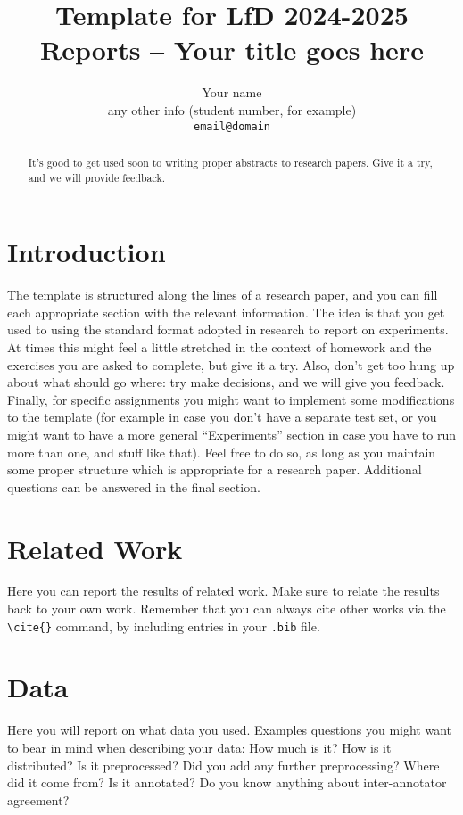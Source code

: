 \documentclass[11pt]{article}
\title{Template for LfD 2024-2025 Reports -- Your title goes here}
\author{Your name \\
  any other info (student number, for example) \\
  {\tt email@domain}}
\date{}
\begin{document}
\maketitle
\begin{abstract}
It's good to get used soon to writing proper abstracts to research papers. Give it a try, and we will provide feedback.
 \end{abstract}



\section{Introduction}

The template is structured along the lines of a research paper, and you can fill each appropriate section with the relevant information. The idea is that you get used to using the standard format adopted in research to report on experiments. At times this might feel a little stretched in the context of homework and the exercises you are asked to complete, but give it a try. Also, don't get too hung up about what should go where: try make decisions, and we will give you feedback. Finally, for specific assignments you might want to implement some modifications to the template (for example in case you don't have a separate test set, or you might want to have a more general ``Experiments'' section in case you have to run more than one, and stuff like that). Feel free to do so, as long as you maintain some proper structure which is appropriate for a research paper. Additional questions can be answered in the final section.

\section{Related Work}

Here you can report the results of related work. Make sure to relate the results back to your own work. Remember that you can always cite other works via the \verb!\cite{}! command, by including entries in your \verb!.bib! file. 

\section{Data}

Here you will report on what data you used.  Examples questions you might want to bear in mind when describing your data: How much is it? How is it distributed? Is it preprocessed? Did you add any further preprocessing? Where did it come from? Is it annotated? Do you know anything about inter-annotator agreement?
\end{document}
